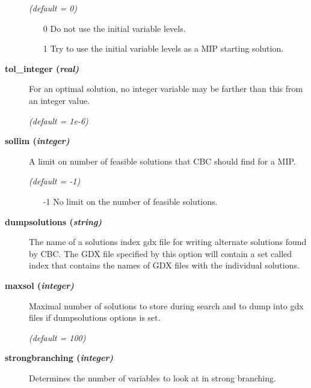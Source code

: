 \begin{description}
\textsl{(default = 0)}
\begin{itemize}
\item[0] 
Do not use the initial variable levels.
\item[1] 
Try to use the initial variable levels as a MIP starting solution.
\end{itemize}

\item[\label{tol_integer}\hypertarget{tol_integer}
{\textbf{tol\_integer (\slshape{real})}}]\hspace{1.0in}

For an optimal solution, no integer variable may be farther than this from an integer value.

\textsl{(default = 1e-6)}

\item[\label{sollim}\hypertarget{sollim}
{\textbf{sollim (\slshape{integer})}}]\hspace{1.0in}

A limit on number of feasible solutions that CBC should find for a MIP.

\textsl{(default = -1)}
\begin{itemize}
\item[-1] 
No limit on the number of feasible solutions.
\end{itemize}

\item[\label{dumpsolutions}\hypertarget{dumpsolutions}
{\textbf{dumpsolutions (\slshape{string})}}]\hspace{1.0in}

The name of a solutions index gdx file for writing alternate solutions found by CBC.
The GDX file specified by this option will contain a set called index that contains the names of GDX files
with the individual solutions.


\item[\label{maxsol}\hypertarget{maxsol}
{\textbf{maxsol (\slshape{integer})}}]\hspace{1.0in}

Maximal number of solutions to store during search and to dump into gdx files if dumpsolutions options is set.

\textsl{(default = 100)}

\item[\label{strongbranching}\hypertarget{strongbranching}
{\textbf{strongbranching (\slshape{integer})}}]\hspace{1.0in}

Determines the number of variables to look at in strong branching.


\end{description}
